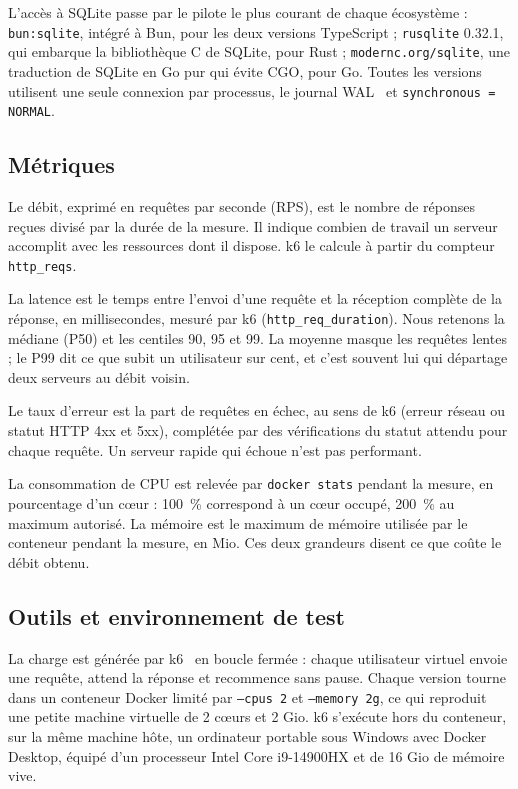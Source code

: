 \documentclass[conference,a4paper]{IEEEtran}
\begin{document}
L'accès à SQLite passe par le pilote le plus courant de chaque
écosystème : \texttt{bun:sqlite}, intégré à Bun, pour les deux versions
TypeScript ; \texttt{rusqlite} 0.32.1, qui embarque la bibliothèque C
de SQLite, pour Rust ; \texttt{modernc.org/sqlite}, une traduction de
SQLite en Go pur qui évite CGO, pour Go. Toutes les versions utilisent
une seule connexion par processus, le journal WAL~\cite{sqlitewal} et
\texttt{synchronous = NORMAL}.

\subsection{Métriques}
Le débit, exprimé en requêtes par seconde (RPS), est le nombre de
réponses reçues divisé par la durée de la mesure. Il indique combien de
travail un serveur accomplit avec les ressources dont il dispose. k6 le
calcule à partir du compteur \texttt{http\_reqs}.

La latence est le temps entre l'envoi d'une requête et la réception
complète de la réponse, en millisecondes, mesuré par k6
(\texttt{http\_req\_duration}). Nous retenons la médiane (P50) et les
centiles 90, 95 et 99. La moyenne masque les requêtes lentes ; le P99
dit ce que subit un utilisateur sur cent, et c'est souvent lui qui
départage deux serveurs au débit voisin.

Le taux d'erreur est la part de requêtes en échec, au sens de k6 (erreur
réseau ou statut HTTP 4xx et 5xx), complétée par des vérifications du
statut attendu pour chaque requête. Un serveur rapide qui échoue n'est
pas performant.

La consommation de CPU est relevée par \texttt{docker stats} pendant la
mesure, en pourcentage d'un cœur : 100~\% correspond à un cœur occupé,
200~\% au maximum autorisé. La mémoire est le maximum de mémoire utilisée par le
conteneur pendant la mesure, en Mio. Ces deux grandeurs
disent ce que coûte le débit obtenu.

\subsection{Outils et environnement de test}
La charge est générée par k6~\cite{k6} en boucle fermée : chaque
utilisateur virtuel envoie une requête, attend la réponse et recommence
sans pause. Chaque version tourne dans un conteneur Docker limité par
\texttt{--cpus 2} et \texttt{--memory 2g}, ce qui reproduit une petite
machine virtuelle de 2 cœurs et 2 Gio. k6 s'exécute hors du conteneur,
sur la même machine hôte, un ordinateur portable sous Windows avec
Docker Desktop, équipé d'un processeur Intel Core i9-14900HX et de
16 Gio de mémoire vive.
\end{document}
